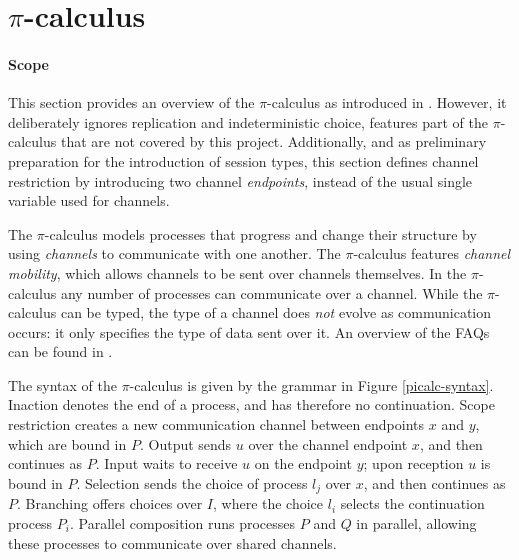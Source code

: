 \documentclass{mproj}
\newcommand{\picalc}{$\pi$-calculus}
\begin{document}
\section{\picalc}\label{pi-calculus}

\paragraph{Scope} This section provides an overview of the \picalc{} as introduced in \cite{Sangiorgi2001}. However, it deliberately ignores replication and indeterministic choice, features part of the \picalc{} that are not covered by this project. Additionally, and as preliminary preparation for the introduction of session types, this section defines channel restriction by introducing two channel \emph{endpoints}, instead of the usual single variable used for channels. 

The \picalc{} \cite{Walker1989,Milner1989,Milner1991,Sangiorgi2001} models processes that progress and change their structure by using \emph{channels} to communicate with one another. The \picalc{} features \emph{channel mobility}, which allows channels to be sent over channels themselves. In the \picalc{} any number of processes can communicate over a channel. While the \picalc{} can be typed, the type of a channel does \emph{not} evolve as communication occurs: it only specifies the type of data sent over it. An overview of the FAQs can be found in \cite{Wing2002}.

The syntax of the \picalc{} is given by the grammar in Figure \ref{picalc-syntax}. Inaction denotes the end of a process, and has therefore no continuation. Scope restriction creates a new communication channel between endpoints $x$ and $y$, which are bound in $P$. Output sends $u$ over the channel endpoint $x$, and then continues as $P$. Input waits to receive $u$ on the endpoint $y$; upon reception $u$ is bound in $P$. Selection sends the choice of process $l_j$ over $x$, and then continues as $P$. Branching offers choices over $I$, where the choice $l_i$ selects the continuation process $P_i$. Parallel composition runs processes $P$ and $Q$ in parallel, allowing these processes to communicate over shared channels.
\end{document}
